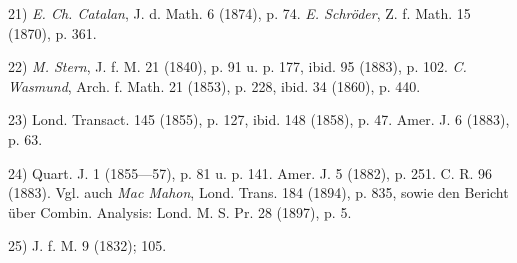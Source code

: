\vspace{-0.2cm}
\leftline{\rule{2in}{0.4pt}}
\vspace{0.1cm}
{
\footnotesize
21) \textit{E. Ch. Catalan}, J. d. Math. 6 (1874), p. 74. \textit{E. Schröder}, Z. f. Math. 15 (1870), p. 361.

22) \textit{M. Stern}, J. f. M. 21 (1840), p. 91 u. p. 177, ibid. 95 (1883), p. 102. \textit{C. Wasmund}, Arch. f. Math. 21 (1853), p. 228, ibid. 34 (1860), p. 440.

23) Lond. Transact. 145 (1855), p. 127, ibid. 148 (1858), p. 47. Amer. J. 6 (1883), p. 63.

24) Quart. J. 1 (1855—57), p. 81 u. p. 141. Amer. J. 5 (1882), p. 251. C. R. 96 (1883). Vgl. auch \textit{Mac Mahon}, Lond. Trans. 184 (1894), p. 835, sowie den Bericht über Combin. Analysis: Lond. M. S. Pr. 28 (1897), p. 5.

25) J. f. M. 9 (1832); 105.

}
